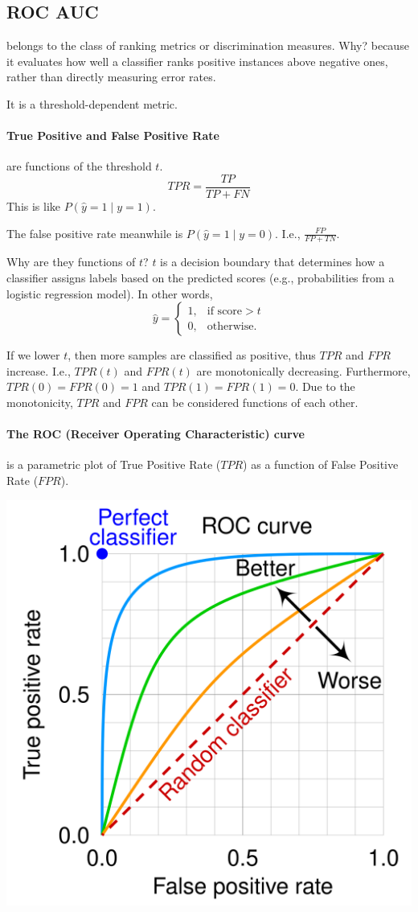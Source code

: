 \documentclass[twoside,11pt]{article}
\begin{document}
\subsection{ROC AUC}
belongs to the class of ranking metrics or discrimination measures. Why? because it evaluates how well a classifier ranks positive instances above negative ones, rather than directly measuring error rates.

It is a threshold-dependent metric.

\paragraph{True Positive and False Positive Rate} are functions of the threshold $t$.
$$ TPR = \frac{TP}{TP + FN} $$
This is like $P(\hat y = 1 \mid y = 1)$.

The false positive rate meanwhile is $P(\hat y = 1 \mid y = 0)$. I.e., $\frac{FP}{FP + TN}$.

Why are they functions of $t$? $t$ is a decision boundary that determines how a classifier assigns labels based on the predicted scores (e.g., probabilities from a logistic regression model). In other words,
$$ \hat y = \begin{cases}
    1, & \text{if score} > t \\
    0, & \text{otherwise.}
\end{cases} $$

If we lower $t$, then more samples are classified as positive, thus $TPR$ and $FPR$ increase. I.e., $TPR(t)$ and $FPR(t)$ are monotonically decreasing. Furthermore, $TPR(0) = FPR(0) = 1$ and $TPR(1) = FPR(1) = 0$. Due to the monotonicity, $TPR$ and $FPR$ can be considered functions of each other.

\paragraph{The ROC (Receiver Operating Characteristic) curve} is a parametric plot of True Positive Rate ($TPR$) as a function of False Positive Rate ($FPR$).

\begin{center}
    \includegraphics[width=.3\textwidth]{Roc_curve.png}    
\end{center}
\end{document}
